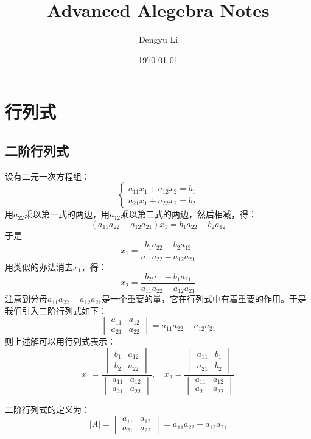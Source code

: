 \documentclass[lang=cn,newtx,10pt,scheme=chinese,thmcnt=section]{elegantbook}
\title{Advanced Alegebra Notes}
\author{Dengyu Li}
\date{\today}
\numberwithin{equation}{section}
\begin{document}
\maketitle
\frontmatter

\tableofcontents

\mainmatter

\chapter{行列式}

\section{二阶行列式}
设有二元一次方程组：
\begin{equation}
\begin{cases}
a_{11}x_1 + a_{12}x_2 = b_1 \\
a_{21}x_1 + a_{22}x_2 = b_2
\end{cases}
\end{equation}
用$a_{22}$乘以第一式的两边，用$a_{12}$乘以第二式的两边，然后相减，得：
\[
(a_{11}a_{22}-a_{12}a_{21})x_1 = b_1a_{22}-b_2a_{12}
\]
于是
\[
x_1 = \frac{b_1a_{22}-b_2a_{12}}{a_{11}a_{22}-a_{12}a_{21}}
\]
用类似的办法消去$x_1$，得：
\[ 
x_2 = \frac{b_2a_{11}-b_1a_{21}}{a_{11}a_{22}-a_{12}a_{21}}
\]
注意到分母$a_{11}a_{22}-a_{12}a_{21}$是一个重要的量，它在行列式中有着重要的作用。于是我们引入二阶行列式如下：
\[  
\begin{vmatrix}
a_{11} & a_{12} \\
a_{21} & a_{22}
\end{vmatrix} = a_{11}a_{22}-a_{12}a_{21}
\]
则上述解可以用行列式表示：
\begin{equation}
x_1 = \frac{\begin{vmatrix}b_1 & a_{12} \\
b_2 & a_{22}\end{vmatrix}}{\begin{vmatrix}a_{11} & a_{12} \\ a_{21} & a_{22}\end{vmatrix}}, \quad
x_2 = \frac{\begin{vmatrix}a_{11} & b_1 \\ a_{21} & b_2\end{vmatrix}}{\begin{vmatrix}a_{11} & a_{12} \\ a_{21} & a_{22}\end{vmatrix}}
\end{equation}
\begin{definition}
    二阶行列式的定义为：
    \[|A| = 
    \begin{vmatrix}
    a_{11} & a_{12} \\
    a_{21} & a_{22}
    \end{vmatrix} = a_{11}a_{22}-a_{12}a_{21}
    \]

\end{definition}
\newpage
\end{document}
